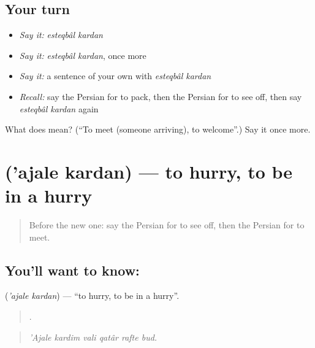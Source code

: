 \subsection*{Your turn}
\begin{itemize}
\raggedright
  \item \emph{Say it:} \emph{esteqbâl kardan}
  \item \emph{Say it:} \emph{esteqbâl kardan}, once more
  \item \emph{Say it:} a sentence of your own with \emph{esteqbâl kardan}
  \item \emph{Recall:} say the Persian for to pack, then the Persian for to see off, then say \emph{esteqbâl kardan} again
\end{itemize}

\begin{tcolorbox}[breakable,colback=teal!4,colframe=teal!35!black,title={Before you move on}]
What does   mean? (\textquotedblleft{}To meet (someone arriving), to welcome\textquotedblright{}.) Say it once more.
\end{tcolorbox}
\section[\texorpdfstring{\fa{عجله} \fa{کردن} ('ajale kardan)}{عجله کردن ('ajale kardan)}]{  ('ajale kardan) — to hurry, to be in a hurry}

\label{lesson:FA-C433-ajale-kardan}



\begin{quote}
Before the new one: say the Persian for to see off, then the Persian for to meet.
\end{quote}

\subsection*{You'll want to know:  }
\textbf{ } (\emph{'ajale kardan}) — \textquotedblleft{}to hurry, to be in a hurry\textquotedblright{}.

\begin{quote}
     .
\end{quote}

\begin{quote}
\emph{'Ajale kardim vali qatâr rafte bud.}
\end{quote}

